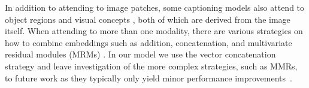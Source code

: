 
In addition to attending to image patches, some captioning models also attend
to object regions \cite{Wang2019Hierarchical} and visual concepts
\cite{You2016ImageCW,Li2019Boosted,Wang2019Hierarchical}, both of which are
derived from the image itself. When attending to more than one modality, there
are various strategies on how to combine embeddings such as addition,
concatenation, and multivariate residual modules (MRMs)
\cite{Kim2016MultimodalRL}. In our model we use the vector concatenation
strategy and leave investigation of the more complex strategies, such as MMRs,
to future work as they typically only yield minor performance
improvements~\cite{Wang2019Hierarchical}.
